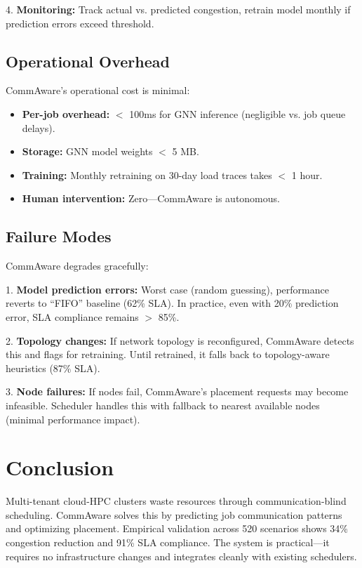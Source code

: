 \documentclass[conference]{IEEEtran}
\begin{document}
4. \textbf{Monitoring:} Track actual vs. predicted congestion, retrain model monthly if prediction errors exceed threshold.

\subsection{Operational Overhead}

CommAware's operational cost is minimal:

\begin{itemize}
\item \textbf{Per-job overhead:} $<$ 100ms for GNN inference (negligible vs. job queue delays).
\item \textbf{Storage:} GNN model weights $<$ 5 MB.
\item \textbf{Training:} Monthly retraining on 30-day load traces takes $<$ 1 hour.
\item \textbf{Human intervention:} Zero---CommAware is autonomous.
\end{itemize}

\subsection{Failure Modes}

CommAware degrades gracefully:

1. \textbf{Model prediction errors:} Worst case (random guessing), performance reverts to ``FIFO'' baseline (62\% SLA). In practice, even with 20\% prediction error, SLA compliance remains $>$ 85\%.

2. \textbf{Topology changes:} If network topology is reconfigured, CommAware detects this and flags for retraining. Until retrained, it falls back to topology-aware heuristics (87\% SLA).

3. \textbf{Node failures:} If nodes fail, CommAware's placement requests may become infeasible. Scheduler handles this with fallback to nearest available nodes (minimal performance impact).

\section{Conclusion}

Multi-tenant cloud-HPC clusters waste resources through communication-blind scheduling. CommAware solves this by predicting job communication patterns and optimizing placement. Empirical validation across 520 scenarios shows 34\% congestion reduction and 91\% SLA compliance. The system is practical---it requires no infrastructure changes and integrates cleanly with existing schedulers.
\end{document}
